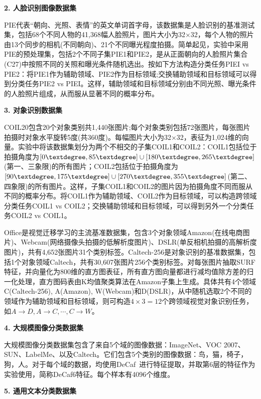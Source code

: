\textbf{2. 人脸识别图像数据集}

PIE代表“朝向、光照、表情”的英文单词首字母，该数据集是人脸识别的基准测试集，包括68个不同人物的41,368幅人脸照片，图片大小为32$\times$32，每个人物的照片由13个同步的相机(不同朝向)、21个不同曝光程度拍摄。简单起见，实验中采用PIE的预处理集，包括2个不同子集PIE1和PIE2，是从正面朝向的人脸照片集合(C27)中按照不同的关照和曝光条件随机选出。按如下方法构造分类任务PIEI vs PIE2：将PIE1作为辅助领域、PIE2作为目标领域;交换辅助领域和目标领域可以得到分类任务PIE2 vs PIEI。这样，辅助领域和目标领域分别由不同光照、曝光条件的人脸照片组成，从而服从显著不同的概率分布。

\textbf{3. 对象识别数据集}

COIL20包含20个对象类别共1,440张图片;每个对象类别包括72张图片，每张图片拍摄时对象水平旋转5度(共360度)。每幅图片大小为32$\times$32，表征为1,024维的向量。实验中将该数据集划分为两个不相交的子集COIL1和COIL2：COIL1包括位于拍摄角度为$[0\textdegree,85\textdegree]\cup[180\textdegree,265\textdegree]$(第一、三象限)的所有图片；COIL2包括位于拍摄角度为$[90\textdegree,175\textdegree]\cup[270\textdegree,355\textdegree]$(第二、四象限)的所有图片。这样，子集COIL1和COIL2的图片因为拍摄角度不同而服从不同的概率分布。将COIL1作为辅助领域、COIL2作为目标领域，可以构造跨领域分类任务COIL1 vs COIL2；交换辅助领域和目标领域，可以得到另外一个分类任务COIL2 vs COIL1。

Office是视觉迁移学习的主流基准数据集，包含3个对象领域Amazon(在线电商图片)、Webcam(网络摄像头拍摄的低解析度图片)、DSLR(单反相机拍摄的高解析度图片)，共有4,652张图片31个类别标签。Caltech-256是对象识别的基准数据集，包括1个对象领域Caltech，共有30,607张图片256个类别标签。对每张图片抽取SURF特征，并向量化为800维的直方图表征，所有直方图向量都进行减均值除方差的归一化处理，直方图码表由K均值聚类算法在Amazon子集上生成。具体共有4个领域C(Caltech-256), A(Amazon), W(Webcam)和D(DSLR)，从中随机选取2个不同的领域作为辅助领域和目标领域，则可构造$4 \times 3 = 12$个跨领域视觉对象识别任务，如$A \rightarrow D, A \rightarrow C, \cdots, C \rightarrow W$。

\textbf{4. 大规模图像分类数据集}

大规模图像分类数据集包含了来自5个域的图像数据：ImageNet、VOC 2007、SUN、LabelMe、以及Caltech。它们包含5个类别的图像数据：鸟，猫，椅子，狗，人。对于每个域的数据，均使用DeCaf~\cite{donahue2014decaf}进行特征提取，并取第6层的特征作为实验使用，简称DeCaf6特征。每个样本有4096个维度。

\textbf{5. 通用文本分类数据集}

